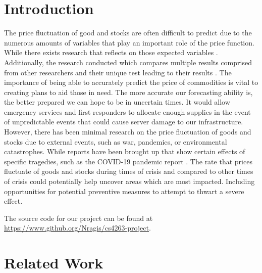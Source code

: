 \documentclass[final]{cvpr}
\begin{document}
\section{Introduction}

    The price fluctuation of good and stocks are often difficult to predict due
    to the numerous amounts of variables that play an important role of the
    price function. While there exists research that reflects on those expected
    variables \cite{romero}. Additionally, the research conducted which compares
    multiple results comprised from other researchers and their unique test
    leading to their results \cite{srivastava}.  The importance of being able to
    accurately predict the price of commodities is vital to creating plans to
    aid those in need. The more accurate our forecasting ability is, the better
    prepared we can hope to be in uncertain times. It would allow emergency
    services and first responders to allocate enough supplies in the event of
    unpredictable events that could cause server damage to our infrastructure.
    However, there has been minimal research on the price fluctuation of goods
    and stocks due to external events, such as war, pandemics, or environmental
    catastrophes. While reports have been brought up that show certain effects
    of specific tragedies, such as the COVID-19 pandemic report \cite{mead}. The
    rate that prices fluctuate of goods and stocks during times of crisis and
    compared to other times of crisis could potentially help uncover areas which
    are most impacted. Including opportunities for potential preventive measures
    to attempt to thwart a severe effect.

    The source code for our project can be found at 
    \url{https://www.github.org/Nragis/cs4263-project}.

\section{Related Work}
\end{document}
